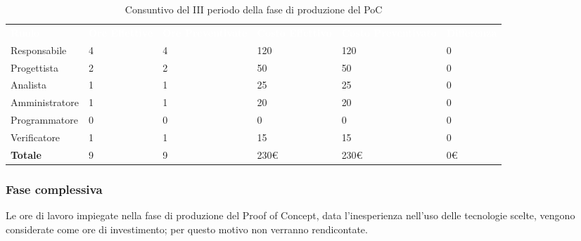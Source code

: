 \begin{table}[H]
\begin{center}
\renewcommand{\arraystretch}{1.5}
\begin{tabular}{ m{}<{\centering}  m{}<{\centering} m{}<{\centering} m{}<{\centering} m{}<{\centering} m{}<{\centering}}
	\rowcolor{darkblue}
	\textcolor{white}{\textbf{Ruolo}} & \textcolor{white}{\textbf{Ore Effettive}} & \textcolor{white}{\textbf{Ore Preventivate}}&\textcolor{white}{\textbf{Costo Effettivo}}&\textcolor{white}{\textbf{Costo Preventivato}}&\textcolor{white}{\textbf{Differenza}}\\ 
	
	Responsabile  & 4 & 4 & 120 & 120 & 0\\	
	
	Progettista & 2 & 2 & 50 & 50 & 0\\
	
	Analista & 1  & 1 & 25 & 25 & 0 \\

	Amministratore & 1 & 1 & 20 & 20 & 0 \\
	
	Programmatore & 0 &0 &0 & 0 & 0 \\
	
	Verificatore & 1 & 1 & 15 & 15 & 0 \\
	
	\textbf{Totale} & 9 & 9 & 230\euro & 230\euro & 0\euro \\
	
\end{tabular}
\caption{Consuntivo del III periodo della fase di produzione del PoC}
\end{center}
\end{table}

\subsubsection{Fase complessiva}
Le ore di lavoro impiegate nella fase di produzione del Proof of Concept, data l'inesperienza nell'uso delle tecnologie scelte, vengono considerate come ore di investimento; per questo motivo non verranno rendicontate.

